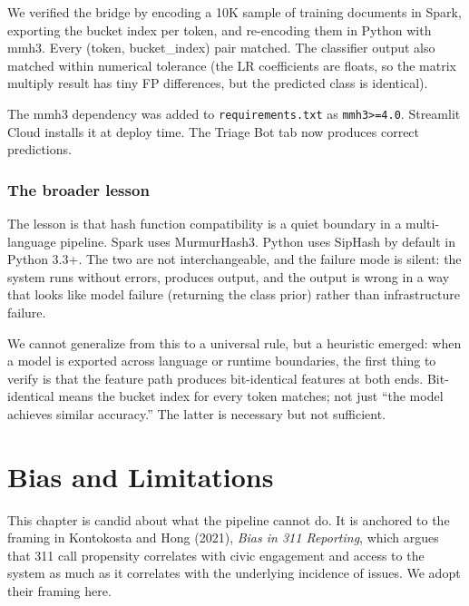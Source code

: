 \documentclass[11pt,letterpaper]{book}
\begin{document}
We verified the bridge by encoding a 10K sample of training documents in Spark, exporting the bucket index per token, and re-encoding them in Python with mmh3. Every (token, bucket\_index) pair matched. The classifier output also matched within numerical tolerance (the LR coefficients are floats, so the matrix multiply result has tiny FP differences, but the predicted class is identical).

The mmh3 dependency was added to \texttt{requirements.txt} as \texttt{mmh3>=4.0}. Streamlit Cloud installs it at deploy time. The Triage Bot tab now produces correct predictions.

\subsection*{The broader lesson}

The lesson is that hash function compatibility is a quiet boundary in a multi-language pipeline. Spark uses MurmurHash3. Python uses SipHash by default in Python 3.3+. The two are not interchangeable, and the failure mode is silent: the system runs without errors, produces output, and the output is wrong in a way that looks like model failure (returning the class prior) rather than infrastructure failure.

We cannot generalize from this to a universal rule, but a heuristic emerged: when a model is exported across language or runtime boundaries, the first thing to verify is that the feature path produces bit-identical features at both ends. Bit-identical means the bucket index for every token matches; not just ``the model achieves similar accuracy.'' The latter is necessary but not sufficient.


\chapter{Bias and Limitations}
\label{ch:bias}

This chapter is candid about what the pipeline cannot do. It is anchored to the framing in Kontokosta and Hong (2021), \emph{Bias in 311 Reporting}, which argues that 311 call propensity correlates with civic engagement and access to the system as much as it correlates with the underlying incidence of issues. We adopt their framing here.
\end{document}

